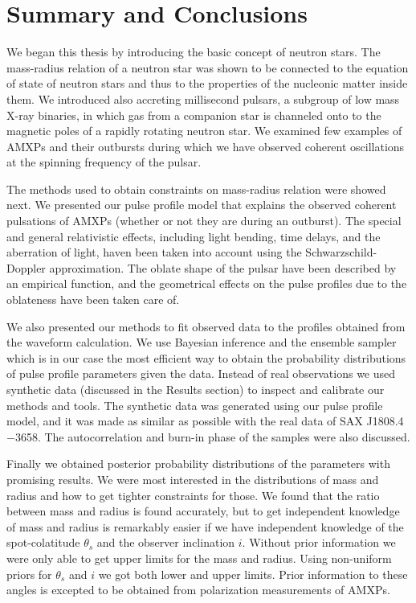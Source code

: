 \documentclass{wihuri}
\def\source{SAX J1808.4$-$3658}
\def\thetas{\theta_{s}}
\begin{document}
\clearpage


\section{Summary and Conclusions}

We began this thesis by introducing the basic concept of neutron stars. The mass-radius relation of a neutron star was shown to be connected to the equation of state of neutron stars and thus to the properties of the nucleonic matter inside them. We introduced also accreting millisecond pulsars, a subgroup of low mass X-ray binaries, in which gas from a companion star is channeled onto to the magnetic poles of a rapidly rotating neutron star. We examined few examples of AMXPs and their outbursts during which we have observed coherent oscillations at the spinning frequency of the pulsar.

The methods used to obtain constraints on mass-radius relation were showed next. We presented our pulse profile model that explains the observed coherent pulsations of AMXPs (whether or not they are during an outburst). %
The special and general relativistic effects, including light bending, time delays, and the aberration of light, haven been taken into account using the Schwarzschild-Doppler approximation. The oblate shape of the pulsar have been described by an empirical function, and the geometrical effects on the pulse profiles due to the oblateness have been taken care of. 

We also presented our methods to fit observed data to the profiles obtained from the waveform calculation. We use Bayesian inference and the ensemble sampler which is in our case the most efficient way to obtain the probability distributions of pulse profile parameters given the data. Instead of real observations we used synthetic data (discussed in the Results section) to inspect and calibrate our methods and tools. The synthetic data was generated using our pulse profile model, and it was made as similar as possible with the real data of \source. The autocorrelation and burn-in phase of the samples were also discussed.

Finally we obtained posterior probability distributions of the parameters with promising results. We were most interested in the distributions of mass and radius and how to get tighter constraints for those. We found that the ratio between mass and radius is found accurately, but to get independent knowledge of mass and radius is remarkably easier if we have independent knowledge of the spot-colatitude $\thetas$ and the observer inclination $i$. Without prior information we were only able to get upper limits for the mass and radius. Using non-uniform priors for $\thetas$ and $i$ we got both lower and upper limits. Prior information to these angles is excepted to be obtained from polarization measurements of AMXPs.  
\end{document}

